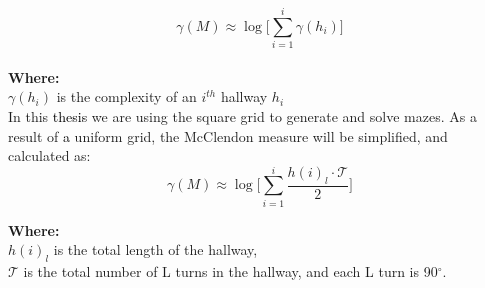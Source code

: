 \begin{equation}
\gamma(M) \approx \log \bigl[\sum_{i =1}^{i}\gamma(h_i)\bigr]
\end{equation}
\\
\textbf{Where:}\\
$\gamma(h_i)$ is the complexity of an $i^{th}$ hallway $h_i$\\
 \newline
In this \textcolor{black}{thesis} we are using the square grid to generate and solve mazes. As a result of \textcolor{black}{a} uniform grid, the McClendon measure will be simplified, and calculated as:
\begin{equation} 
\gamma(M) \approx \log \bigl[\sum_{i =1}^{i}\frac{h(i)_l\cdot \mathcal{T}}{2}\bigr]
\end{equation}

\textbf{Where:}\\
$h(i)_l$ is the total length of the hallway,\\
$\mathcal{T}$ is the total number of L turns in the hallway, and each L turn is 90$^\circ$.%
